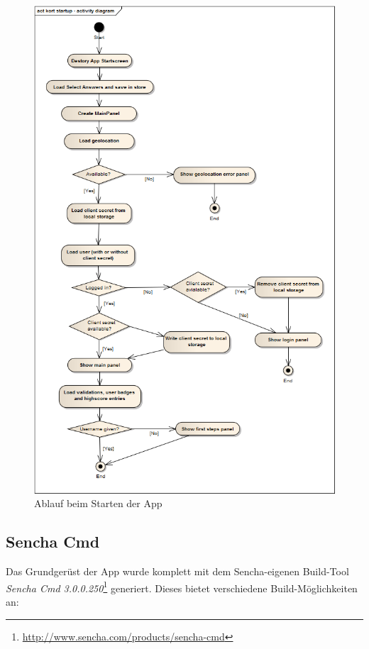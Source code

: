 \begin{figure}[H]
	\centering
	\includegraphics[scale=0.63]{images/uml/kort-startup-activitydiagram}
	\caption{Ablauf beim Starten der App}
	\label{image-kort-startup-activitydiagram}
\end{figure}

\subsection{Sencha Cmd}
\label{sencha-cmd}
Das Grundgerüst der App wurde komplett mit dem Sencha-eigenen Build-Tool \emph{Sencha Cmd 3.0.0.250}\footnote{\url{http://www.sencha.com/products/sencha-cmd}} generiert.
Dieses bietet verschiedene Build-Möglichkeiten an:

